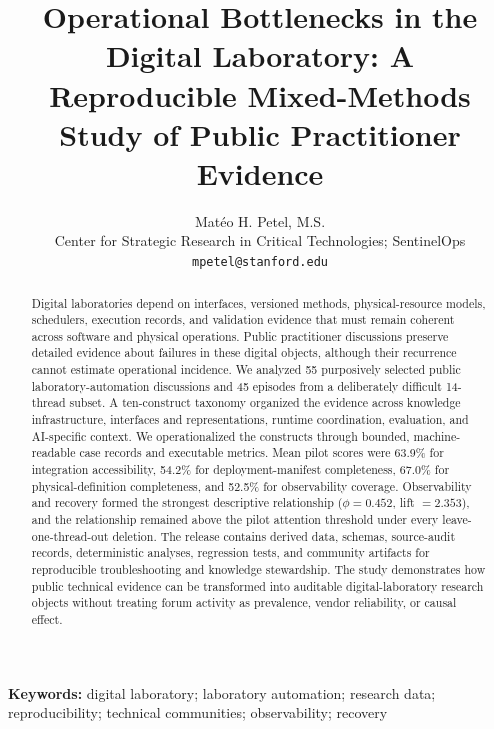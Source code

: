 \documentclass[11pt]{article}
\title{Operational Bottlenecks in the Digital Laboratory: A Reproducible Mixed-Methods Study of Public Practitioner Evidence}
\author{Mat\'eo H. Petel, M.S.\\Center for Strategic Research in Critical Technologies; SentinelOps\\\texttt{mpetel@stanford.edu}}
\date{}
\begin{document}
\maketitle

\begin{abstract}
Digital laboratories depend on interfaces, versioned methods, physical-resource models, schedulers, execution records, and validation evidence that must remain coherent across software and physical operations. Public practitioner discussions preserve detailed evidence about failures in these digital objects, although their recurrence cannot estimate operational incidence. We analyzed 55 purposively selected public laboratory-automation discussions and 45 episodes from a deliberately difficult 14-thread subset. A ten-construct taxonomy organized the evidence across knowledge infrastructure, interfaces and representations, runtime coordination, evaluation, and AI-specific context. We operationalized the constructs through bounded, machine-readable case records and executable metrics. Mean pilot scores were 63.9\% for integration accessibility, 54.2\% for deployment-manifest completeness, 67.0\% for physical-definition completeness, and 52.5\% for observability coverage. Observability and recovery formed the strongest descriptive relationship ($\phi=0.452$, lift $=2.353$), and the relationship remained above the pilot attention threshold under every leave-one-thread-out deletion. The release contains derived data, schemas, source-audit records, deterministic analyses, regression tests, and community artifacts for reproducible troubleshooting and knowledge stewardship. The study demonstrates how public technical evidence can be transformed into auditable digital-laboratory research objects without treating forum activity as prevalence, vendor reliability, or causal effect.
\end{abstract}

\noindent\textbf{Keywords:} digital laboratory; laboratory automation; research data; reproducibility; technical communities; observability; recovery













\end{document}

